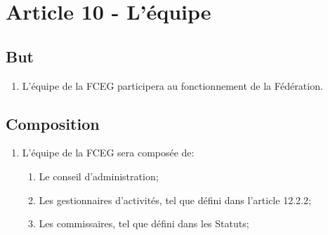 \section{Article 10 - L’équipe}
\label{article-10-l-equipe}

\subsection{But}
\label{but}

\begin{enumerate}
 \item
  L’équipe de la FCEG participera au fonctionnement de la Fédération.
\end{enumerate}

\subsection{Composition}
\label{composition-4}

\begin{enumerate}
 \item L’équipe de la FCEG sera composée de:
  \begin{enumerate}
   \item
    Le conseil d’administration;
   \item
    Les gestionnaires d’activités, tel que défini dans l’article 12.2.2;
   \item
    Les commissaires, tel que défini dans les Statuts;
  \end{enumerate}
\end{enumerate}
